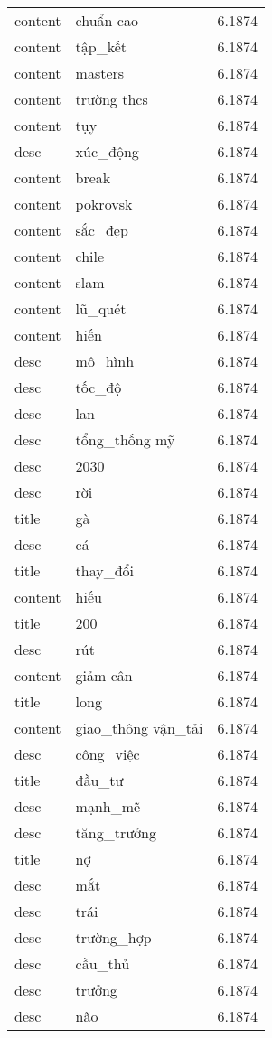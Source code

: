 \documentclass{article}
\begin{document}
\begin{tabular}{lll}
content & chuẩn cao & 6.1874\\
content & tập\_kết & 6.1874\\
content & masters & 6.1874\\
content & trường thcs & 6.1874\\
content & tụy & 6.1874\\
desc & xúc\_động & 6.1874\\
content & break & 6.1874\\
content & pokrovsk & 6.1874\\
content & sắc\_đẹp & 6.1874\\
content & chile & 6.1874\\
content & slam & 6.1874\\
content & lũ\_quét & 6.1874\\
content & hiến & 6.1874\\
desc & mô\_hình & 6.1874\\
desc & tốc\_độ & 6.1874\\
desc & lan & 6.1874\\
desc & tổng\_thống mỹ & 6.1874\\
desc & 2030 & 6.1874\\
desc & rời & 6.1874\\
title & gà & 6.1874\\
desc & cá & 6.1874\\
title & thay\_đổi & 6.1874\\
content & hiếu & 6.1874\\
title & 200 & 6.1874\\
desc & rút & 6.1874\\
content & giảm cân & 6.1874\\
title & long & 6.1874\\
content & giao\_thông vận\_tải & 6.1874\\
desc & công\_việc & 6.1874\\
title & đầu\_tư & 6.1874\\
desc & mạnh\_mẽ & 6.1874\\
desc & tăng\_trưởng & 6.1874\\
title & nợ & 6.1874\\
desc & mắt & 6.1874\\
desc & trái & 6.1874\\
desc & trường\_hợp & 6.1874\\
desc & cầu\_thủ & 6.1874\\
desc & trưởng & 6.1874\\
desc & não & 6.1874\\

\end{tabular}
\end{document}
